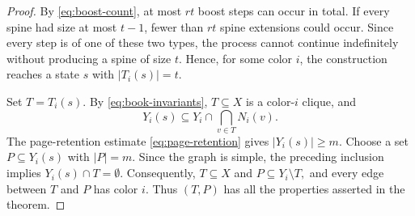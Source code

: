\documentclass[10pt,a4paper]{amsart}
\begin{document}
\begin{proof}
By \eqref{eq:boost-count}, at most $rt$ boost steps can occur in total. If
every spine had size at most $t-1$, fewer than $rt$ spine extensions could
occur. Since every step is of one of these two types, the process cannot
continue indefinitely without producing a spine of size $t$. Hence, for some
color $i$, the construction reaches a state $s$ with $|T_i(s)|=t$.

Set $T=T_i(s)$. By \eqref{eq:book-invariants}, $T\subseteq X$ is a
color-$i$ clique, and
\[
 Y_i(s)\subseteq Y_i\cap\bigcap_{v\in T}N_i(v).
\]
The page-retention estimate \eqref{eq:page-retention} gives
$|Y_i(s)|\ge m$. Choose a set $P\subseteq Y_i(s)$ with $|P|=m$. Since the
graph is simple, the preceding inclusion implies $Y_i(s)\cap T=\emptyset$.
Consequently,
$
 T\subseteq X$ and
 $P\subseteq Y_i\setminus T,$
and every edge between $T$ and $P$ has color $i$. Thus $(T,P)$ has all the
properties asserted in the theorem.
\end{proof}
\end{document}
